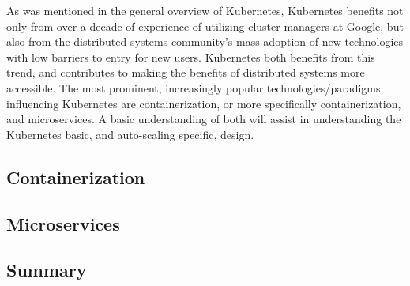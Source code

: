 As was mentioned in the general overview of Kubernetes, Kubernetes benefits not
only from over a decade of experience of utilizing cluster managers at Google,
but also from the distributed systems community's mass adoption of new
technologies with low barriers to entry for new users. Kubernetes both benefits
from this trend, and contributes to making the benefits of distributed systems
more accessible. The most prominent, increasingly popular technologies/paradigms
influencing Kubernetes are containerization, or more specifically
containerization, and microservices. A basic understanding of both will assist
in understanding the Kubernetes basic, and auto-scaling specific, design.

\subsection{Containerization}



\subsection{Microservices}



\subsection{Summary}


